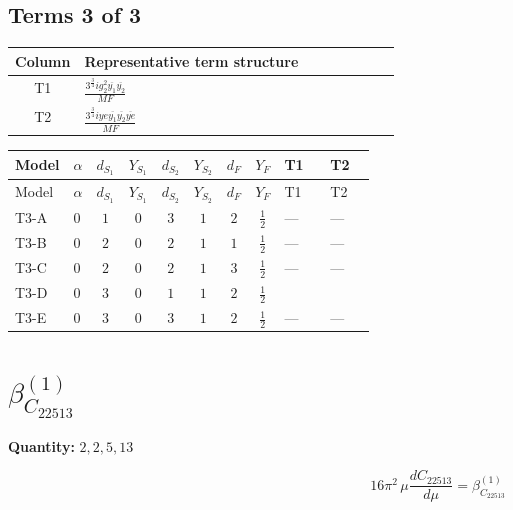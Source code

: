 \documentclass[8pt]{article}
\begin{document}
\begin{landscape}
\subsection*{Terms 3 of 3}
\begin{center}
\begin{tabular}{@{}c >{\raggedright\arraybackslash}p{0.82\linewidth}@{}}
\toprule
Column & Representative term structure \\
\midrule
T1 & \(\displaystyle \frac{3^{\frac{3}{4}} i g_{2}^{2} \overline{y_{1}} \overline{y_{2}}}{MF}\) \\
\midrule
T2 & \(\displaystyle \frac{3^{\frac{3}{4}} i ye \overline{y_{1}} \overline{y_{2}} \overline{ye}}{MF}\) \\
\midrule
\bottomrule
\end{tabular}
\end{center}
\smallskip
\tiny
\begin{longtable}{@{}llcccccc >{\raggedright\arraybackslash}p{0.21\linewidth} >{\raggedright\arraybackslash}p{0.21\linewidth}@{}}
\toprule
Model & $\alpha$ & $d_{S_1}$ & $Y_{S_1}$ & $d_{S_2}$ & $Y_{S_2}$ & $d_F$ & $Y_F$ & T1 & T2 \\
\midrule
\endfirsthead
\toprule
Model & $\alpha$ & $d_{S_1}$ & $Y_{S_1}$ & $d_{S_2}$ & $Y_{S_2}$ & $d_F$ & $Y_F$ & T1 & T2 \\
\midrule
\endhead
T3-A & $0$ & $1$ & $0$ & $3$ & $1$ & $2$ & $\frac{1}{2}$ & --- & --- \\
\midrule
T3-B & $0$ & $2$ & $0$ & $2$ & $1$ & $1$ & $\frac{1}{2}$ & --- & --- \\
\midrule
T3-C & $0$ & $2$ & $0$ & $2$ & $1$ & $3$ & $\frac{1}{2}$ & --- & --- \\
\midrule
T3-D & $0$ & $3$ & $0$ & $1$ & $1$ & $2$ & $\frac{1}{2}$ & \scriptsize\adjustbox{max width=\linewidth}{$\begin{gathered} \frac{11 \cdot 3^{\frac{3}{4}} i g_{2}^{2} \overline{y_{1}} \overline{y_{2}}}{8 MF}\end{gathered}$} & \scriptsize\adjustbox{max width=\linewidth}{$\begin{gathered} - \frac{3^{\frac{3}{4}} i ye \overline{y_{1}} \overline{y_{2}} \overline{ye}}{12 MF}\end{gathered}$} \\
\midrule
T3-E & $0$ & $3$ & $0$ & $3$ & $1$ & $2$ & $\frac{1}{2}$ & --- & --- \\
\midrule
\bottomrule
\end{longtable}
\clearpage
\section*{$\beta_{C_{22513}}^{(1)}$}
\noindent\textbf{Quantity: }$\mathrm{2,2,5,13}$\par\smallskip
\[16\pi^2\,\mu\frac{d C_{22513}}{d\mu}=\beta_{C_{22513}}^{(1)}\]

\end{landscape}
\end{document}
